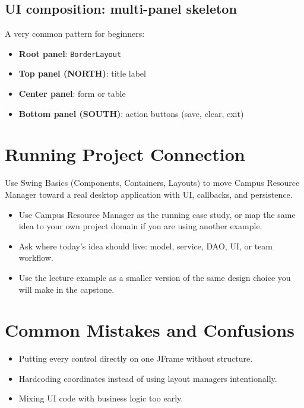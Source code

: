 \documentclass[11pt]{article}
\begin{document}
\subsection{UI composition: multi-panel skeleton}
A very common pattern for beginners:
\begin{itemize}
  \item \textbf{Root panel}: \texttt{BorderLayout}
  \item \textbf{Top panel (NORTH)}: title label
  \item \textbf{Center panel}: form or table
  \item \textbf{Bottom panel (SOUTH)}: action buttons (save, clear, exit)
\end{itemize}
\notesources{\OOPSUnitIVSources}

\section{Running Project Connection}
Use Swing Basics (Components, Containers, Layouts) to move Campus Resource Manager toward a real desktop application with UI, callbacks, and persistence.
\begin{itemize}
  \item Use Campus Resource Manager as the running case study, or map the same idea to your own project domain if you are using another example.
  \item Ask where today's idea should live: model, service, DAO, UI, or team workflow.
  \item Use the lecture example as a smaller version of the same design choice you will make in the capstone.
\end{itemize}
\notesources{\OOPSUnitIVSources}

\section{Common Mistakes and Confusions}
\begin{itemize}
  \item Putting every control directly on one JFrame without structure.
  \item Hardcoding coordinates instead of using layout managers intentionally.
  \item Mixing UI code with business logic too early.
\end{itemize}
\notesources{\OOPSUnitIVSources}
\end{document}
